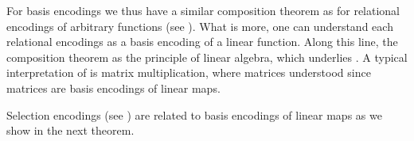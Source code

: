 For basis encodings we thus have a similar composition theorem as for relational encodings of arbitrary functions (see ).
What is more, one can understand each relational encodings as a basis encoding of a linear function.
Along this line, the composition theorem  as the principle of linear algebra, which underlies .
A typical interpretation of  is matrix multiplication, where matrices understood since matrices are basis encodings of linear maps.


Selection encodings (see ) are related to basis encodings of linear maps as we show in the next theorem.

